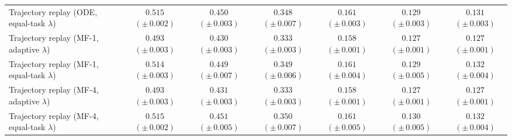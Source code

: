\begin{table}[t]
{\begin{tabular}{@{}lcccccc@{}}
\rowcolor{trajectoryrow} Trajectory replay (ODE, equal-task $\lambda$) & $0.515$ {\scriptsize $(\pm\,0.002)$} & $0.450$ {\scriptsize $(\pm\,0.003)$} & $0.348$ {\scriptsize $(\pm\,0.007)$} & $0.161$ {\scriptsize $(\pm\,0.003)$} & $0.129$ {\scriptsize $(\pm\,0.003)$} & $0.131$ {\scriptsize $(\pm\,0.003)$} \\
\rowcolor{trajectoryrow} Trajectory replay (MF-1, adaptive $\lambda$) & $0.493$ {\scriptsize $(\pm\,0.003)$} & $0.430$ {\scriptsize $(\pm\,0.003)$} & $0.333$ {\scriptsize $(\pm\,0.003)$} & $0.158$ {\scriptsize $(\pm\,0.001)$} & $0.127$ {\scriptsize $(\pm\,0.001)$} & $0.127$ {\scriptsize $(\pm\,0.001)$} \\
\rowcolor{trajectoryrow} Trajectory replay (MF-1, equal-task $\lambda$) & $0.514$ {\scriptsize $(\pm\,0.003)$} & $0.449$ {\scriptsize $(\pm\,0.007)$} & $0.349$ {\scriptsize $(\pm\,0.006)$} & $0.161$ {\scriptsize $(\pm\,0.004)$} & $0.129$ {\scriptsize $(\pm\,0.005)$} & $0.132$ {\scriptsize $(\pm\,0.004)$} \\
\rowcolor{trajectoryrow} Trajectory replay (MF-4, adaptive $\lambda$) & $0.493$ {\scriptsize $(\pm\,0.003)$} & $0.431$ {\scriptsize $(\pm\,0.003)$} & $0.333$ {\scriptsize $(\pm\,0.003)$} & $0.158$ {\scriptsize $(\pm\,0.001)$} & $0.127$ {\scriptsize $(\pm\,0.001)$} & $0.127$ {\scriptsize $(\pm\,0.001)$} \\
\rowcolor{trajectoryrow} Trajectory replay (MF-4, equal-task $\lambda$) & $0.515$ {\scriptsize $(\pm\,0.002)$} & $0.451$ {\scriptsize $(\pm\,0.005)$} & $0.350$ {\scriptsize $(\pm\,0.007)$} & $0.161$ {\scriptsize $(\pm\,0.005)$} & $0.130$ {\scriptsize $(\pm\,0.005)$} & $0.132$ {\scriptsize $(\pm\,0.004)$} \\
\bottomrule
\end{tabular}%
}
\end{table}
